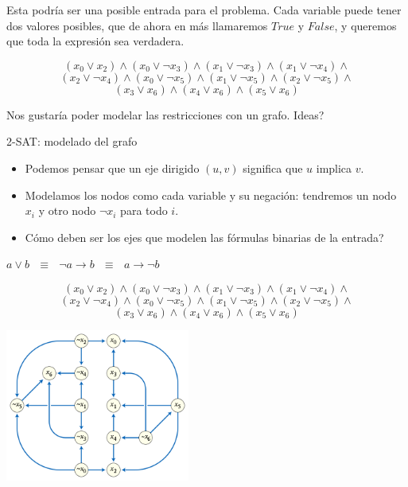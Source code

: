 \documentclass[compress]{beamer}
\newcommand{\bigpause}{\bigskip \pause}
\begin{document}
\begin{frame}

Esta podría ser una posible entrada para el problema. Cada variable
puede tener dos valores posibles, que de ahora en más llamaremos $True$
y $False$, y queremos que toda la expresión sea verdadera. \\
\bigskip

$$(x_0\lor x_2)\land(x_0\lor\lnot x_3)\land(x_1\lor\lnot x_3)\land(x_1\lor\lnot x_4)\land$$
$$(x_2\lor\lnot x_4)\land{}(x_0\lor \lnot x_5)\land (x_1\lor\lnot x_5)\land (x_2\lor\lnot x_5)\land$$
$$(x_3\lor x_6)\land (x_4\lor x_6)\land (x_5\lor x_6)$$

\bigskip

Nos gustaría poder modelar las restricciones con un grafo. 
\textquestiondown Ideas?

\end{frame}

\begin{frame}{2-SAT: modelado del grafo}
\begin{itemize}
\item Podemos pensar que un eje dirigido $(u,v)$ significa que $u$ implica $v$.

\item Modelamos los nodos como cada variable y su negación: tendremos un nodo
$x_i$ y otro nodo $\lnot x_i$ para todo $i$.

\item \textquestiondown Cómo deben ser los ejes que modelen las fórmulas
binarias de la entrada?
\end{itemize}

\bigpause
\begin{center}
$a \lor b \ \ \ \equiv \ \ \ \lnot a \rightarrow b \ \ \ \equiv \ \ \ a \rightarrow \lnot b$
\end{center}

\end{frame}

\begin{frame}

$$(x_0\lor x_2)\land(x_0\lor\lnot x_3)\land(x_1\lor\lnot x_3)\land(x_1\lor\lnot x_4)\land$$
$$(x_2\lor\lnot x_4)\land{}(x_0\lor \lnot x_5)\land (x_1\lor\lnot x_5)\land (x_2\lor\lnot x_5)\land$$
$$(x_3\lor x_6)\land (x_4\lor x_6)\land (x_5\lor x_6)$$

\bigskip

\begin{center}
\includegraphics[height=5cm]{2sat.png}
\end{center}

\end{frame}
\end{document}
